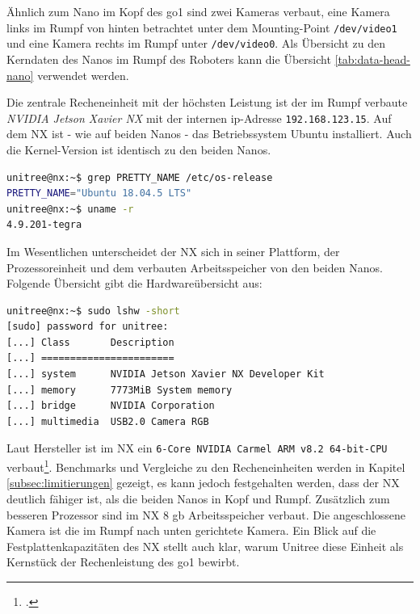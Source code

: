 Ähnlich zum Nano im Kopf des \gls{go1} sind zwei Kameras verbaut, eine Kamera links im Rumpf von hinten betrachtet unter dem Mounting-Point
\texttt{/dev/video1} und eine Kamera rechts im Rumpf unter \texttt{/dev/video0}.
Als Übersicht zu den Kerndaten des Nanos im Rumpf des Roboters kann die Übersicht \ref{tab:data-head-nano} verwendet werden.

\label{par:nx}

Die zentrale Recheneinheit mit der höchsten Leistung ist der im Rumpf verbaute \emph{NVIDIA Jetson Xavier NX} mit der internen
\gls{ip}-Adresse \texttt{192.168.123.15}.
Auf dem NX ist - wie auf beiden Nanos - das Betriebssystem Ubuntu installiert.
Auch die Kernel-Version ist identisch zu den beiden Nanos.

\begin{lstlisting}[language=sh, label=lst:nx-os]
unitree@nx:~$ grep PRETTY_NAME /etc/os-release
PRETTY_NAME="Ubuntu 18.04.5 LTS"
unitree@nx:~$ uname -r
4.9.201-tegra
\end{lstlisting}

Im Wesentlichen unterscheidet der NX sich in seiner Plattform, der Prozessoreinheit und dem verbauten Arbeitsspeicher
von den beiden Nanos.
Folgende Übersicht gibt die Hardwareübersicht aus:

\begin{lstlisting}[language=sh, label=lst:nanos-hardware-rumpf-nx, columns=fixed]
unitree@nx:~$ sudo lshw -short
[sudo] password for unitree:
[...] Class       Description
[...] =======================
[...] system      NVIDIA Jetson Xavier NX Developer Kit
[...] memory      7773MiB System memory
[...] bridge      NVIDIA Corporation
[...] multimedia  USB2.0 Camera RGB
\end{lstlisting}

Laut Hersteller ist im NX ein \texttt{6-Core NVIDIA Carmel ARM v8.2 64-bit-CPU} verbaut\footcite{nvidia_website_vergleich}.
Benchmarks und Vergleiche zu den Recheneinheiten werden in Kapitel \ref{subsec:limitierungen} gezeigt, es kann jedoch
festgehalten werden, dass der NX deutlich fähiger ist, als die beiden Nanos in Kopf und Rumpf.
Zusätzlich zum besseren Prozessor sind im NX \num{8} \gls{gb} Arbeitsspeicher verbaut.
Die angeschlossene Kamera ist die im Rumpf nach unten gerichtete Kamera.
Ein Blick auf die Festplattenkapazitäten des NX stellt auch klar, warum Unitree diese Einheit als Kernstück der Rechenleistung des
\gls{go1} bewirbt.

